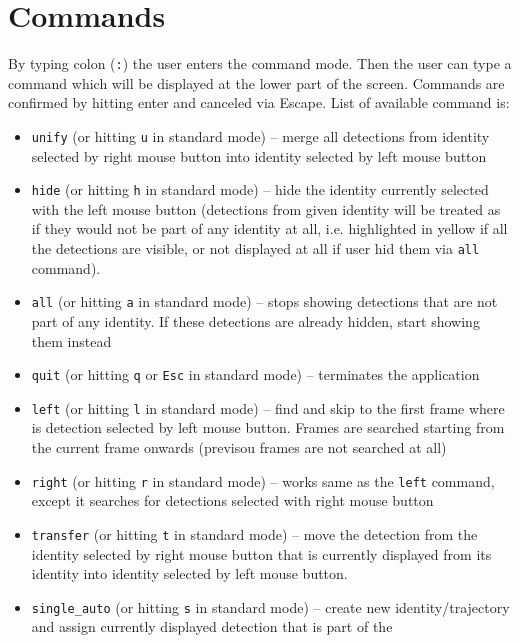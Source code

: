 \section{Commands}
\label{sec:commands}

By typing colon (\verb+:+) the user enters the command mode. Then the user can type
a command which will be displayed at the lower part of the screen. Commands are confirmed
by hitting enter and canceled via Escape. List of available command is:

\begin{itemize}
    \item \verb+unify+ (or hitting \verb+u+ in standard mode) -- merge all detections
    from identity selected by right mouse button into identity selected by left mouse 
    button
    \item \verb+hide+ (or hitting \verb+h+ in standard mode) -- hide the identity
    currently selected with the left mouse button (detections from given identity
    will be treated as if they would not be part of any identity at all, i.e.
    highlighted in yellow if all the detections are visible, or not displayed at all
    if user hid them via \verb+all+ command).
    \item \verb+all+ (or hitting \verb+a+ in standard mode) -- stops showing detections
    that are not part of any identity. If these detections are already hidden, start
    showing them instead
    \item \verb+quit+ (or hitting \verb+q+ or \verb+Esc+ in standard mode) -- terminates
    the application
    \item \verb+left+ (or hitting \verb+l+ in standard mode) -- find and skip to the
    first frame where is detection selected by left mouse button. Frames are searched
    starting from the current frame onwards (previsou frames are not searched at all)
    \item \verb+right+ (or hitting \verb+r+ in standard mode) -- works same as the 
    \verb+left+ command, except it searches for detections selected with right mouse
    button
    \item \verb+transfer+ (or hitting \verb+t+ in standard mode) -- move the detection
    from the identity selected by right mouse button that is currently displayed from
    its identity into identity selected by left mouse button.
    \item \verb+single_auto+ (or hitting \verb+s+ in standard mode) -- create new
    identity/trajectory and assign currently displayed detection that is part of the

\end{itemize}
